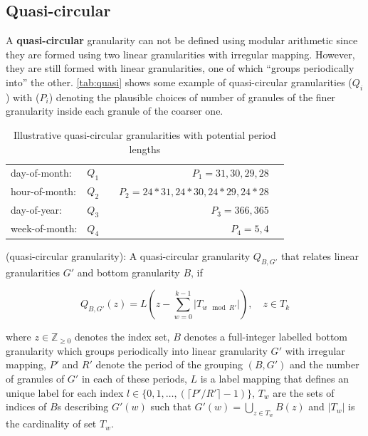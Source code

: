 \documentclass[12pt]{article}
\begin{document}
\hypertarget{sec:quasi-circular-gran-def}{%
\subsection{Quasi-circular}\label{sec:quasi-circular-gran-def}}

A \textbf{quasi-circular} granularity can not be defined using modular arithmetic since they are formed using two linear granularities with irregular mapping. However, they are still formed with linear granularities, one of which ``groups periodically into'' the other. \autoref{tab:quasi} shows some example of quasi-circular granularities (\(Q_i\)) with (\(P_i\)) denoting the plausible choices of number of granules of the finer granularity inside each granule of the coarser one.

\begin{table}[ht]
\begin{center}
\begin{tabular}{lr@{~}lr@{~}r}
\toprule

day-of-month: & $Q_1$ && $P_1 = 31, 30, 29, 28$\\
hour-of-month: & $Q_2$ && $P_2 = 24*31, 24*30, 24*29, 24*28$\\
day-of-year: & $Q_3$ && $P_3 = 366, 365$\\
week-of-month: & $Q_4$ && $P_4 = 5, 4$\\ 
\bottomrule
\end{tabular}
\end{center}
\caption{Illustrative quasi-circular granularities with potential period lengths}
\label{tab:quasi}
\end{table}

\begin{definition}\label{def:quasicircular}
(quasi-circular granularity): A quasi-circular granularity $Q_{B, G'}$ that relates linear granularities $G'$ and bottom granularity $B$, if

\begin{equation}\label{eq:quasi}
Q_{B, G'}(z) = L(z - \sum_{w=0}^{k-1}\vert T_{w \mod R'} \vert), \quad z \in T_k
\end{equation}

where
$z \in \mathbb{Z}_{\geq 0}$ denotes the index set,
$B$ denotes a full-integer labelled bottom granularity which groups periodically into linear granularity $G'$ with irregular mapping, $P'$ and $R'$ denote the period of the grouping $(B, G')$ and the number of granules of $G'$ in each of these periods, ${L}$ is a label mapping that defines an unique label for each index $l \in \{0,1,\dots, (\lceil P'/R' \rceil-1)\}$, $T_w$ are the sets of indices of $B$s describing $G'(w)$ such that  $G'(w) = \bigcup_{z \in T_w}B(z)$ and $\vert T_w \vert$ is the cardinality of set $T_w$.
\end{definition}
\end{document}
